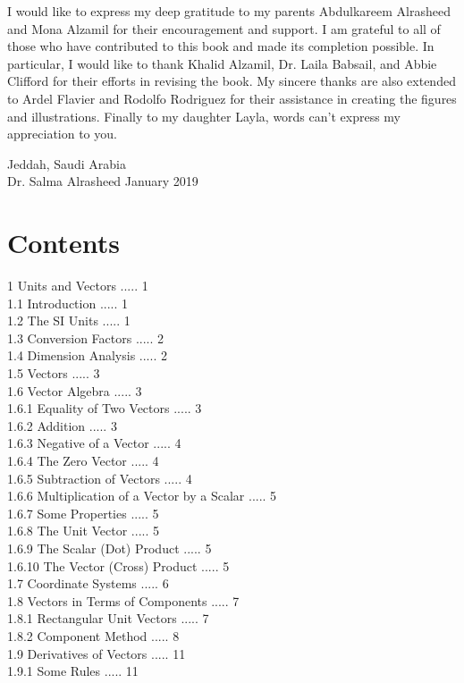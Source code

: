 \documentclass[10pt]{article}
\begin{document}
I would like to express my deep gratitude to my parents Abdulkareem Alrasheed and Mona Alzamil for their encouragement and support. I am grateful to all of those who have contributed to this book and made its completion possible. In particular, I would like to thank Khalid Alzamil, Dr. Laila Babsail, and Abbie Clifford for their efforts in revising the book. My sincere thanks are also extended to Ardel Flavier and Rodolfo Rodriguez for their assistance in creating the figures and illustrations. Finally to my daughter Layla, words can't express my appreciation to you.

Jeddah, Saudi Arabia\\
Dr. Salma Alrasheed January 2019

\section*{Contents}
1 Units and Vectors ..... 1\\
1.1 Introduction ..... 1\\
1.2 The SI Units ..... 1\\
1.3 Conversion Factors ..... 2\\
1.4 Dimension Analysis ..... 2\\
1.5 Vectors ..... 3\\
1.6 Vector Algebra ..... 3\\
1.6.1 Equality of Two Vectors ..... 3\\
1.6.2 Addition ..... 3\\
1.6.3 Negative of a Vector ..... 4\\
1.6.4 The Zero Vector ..... 4\\
1.6.5 Subtraction of Vectors ..... 4\\
1.6.6 Multiplication of a Vector by a Scalar ..... 5\\
1.6.7 Some Properties ..... 5\\
1.6.8 The Unit Vector ..... 5\\
1.6.9 The Scalar (Dot) Product ..... 5\\
1.6.10 The Vector (Cross) Product ..... 5\\
1.7 Coordinate Systems ..... 6\\
1.8 Vectors in Terms of Components ..... 7\\
1.8.1 Rectangular Unit Vectors ..... 7\\
1.8.2 Component Method ..... 8\\
1.9 Derivatives of Vectors ..... 11\\
1.9.1 Some Rules ..... 11\\
\end{document}
